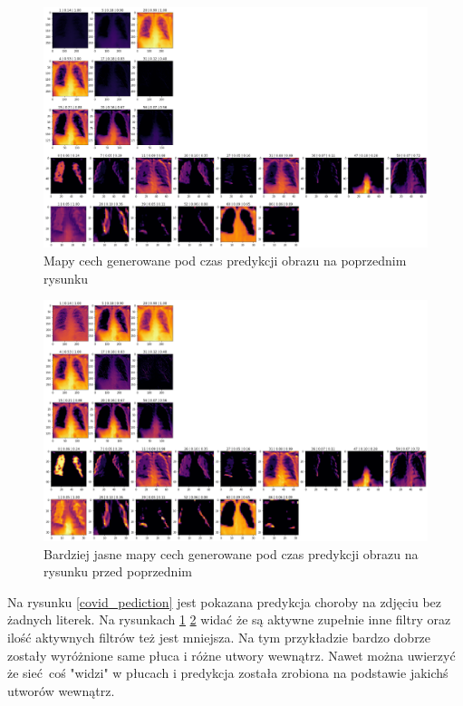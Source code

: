 \documentclass{article}
\begin{document}
\begin{figure}[H]
	\centering
	\includegraphics[width=1\textwidth,keepaspectratio=true]{covid_filters_dark}
	\caption{Mapy cech generowane pod czas predykcji obrazu na poprzednim rysunku}
	\label{covid_filters_dark}
\end{figure}

\begin{figure}[H]
	\centering
	\includegraphics[width=1\textwidth,keepaspectratio=true]{covid_filters_light}
	\caption{Bardziej jasne mapy cech generowane pod czas predykcji obrazu na rysunku przed poprzednim}
	\label{covid_filters_light}
\end{figure}


Na rysunku \ref{covid_pediction} jest pokazana predykcja choroby na zdjęciu bez żadnych literek. Na rysunkach \ref{covid_filters_dark} \ref{covid_filters_light} widać że są aktywne zupełnie inne filtry oraz ilość aktywnych filtrów też jest mniejsza. Na tym przykładzie bardzo dobrze zostały wyróżnione same płuca i różne utwory wewnątrz. Nawet można uwierzyć że sieć coś "widzi" w płucach i predykcja została zrobiona na podstawie jakichś utworów wewnątrz. 
\end{document}
